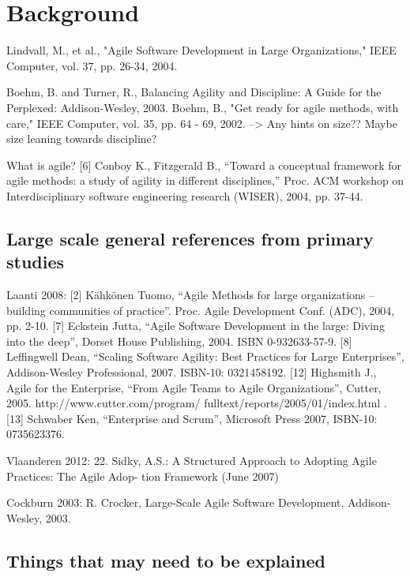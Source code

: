 \documentclass[preprint,authoryear,12pt]{elsarticle}
\begin{document}
\section{Background}
\label{sec:background}

Lindvall, M., et al., "Agile Software Development in Large Organizations,"
IEEE Computer, vol. 37, pp. 26-34, 2004.


Boehm, B. and Turner, R., Balancing Agility and Discipline: A Guide for the
Perplexed: Addison-Wesley, 2003.
Boehm, B., "Get ready for agile methods, with care," IEEE Computer, vol. 35,
pp. 64 - 69, 2002.
--> Any hints on size?? Maybe size leaning towards discipline?


What is agile?
[6] Conboy K., Fitzgerald B., “Toward a conceptual framework for agile methods:
a study of agility in different disciplines,”
Proc. ACM workshop on Interdisciplinary software engineering research (WISER), 2004, pp. 37-44.


\subsection{Large scale general references from primary studies}

Laanti 2008:
[2] Kähkönen Tuomo, “Agile Methods for large organizations – building communities of practice”.
Proc. Agile Development Conf. (ADC), 2004, pp. 2-10.
[7] Eckstein Jutta, “Agile Software Development in the large: Diving into the deep”,
Dorset House Publishing, 2004. ISBN 0-932633-57-9.
[8] Leffingwell Dean, “Scaling Software Agility: Best Practices for Large Enterprises”,
Addison-Wesley Professional, 2007. ISBN-10: 0321458192.
[12] Highsmith J., Agile for the Enterprise, “From Agile Teams to Agile Organizations”,
Cutter, 2005. http://www.cutter.com/program/ fulltext/reports/2005/01/index.html .
[13] Schwaber Ken, “Enterprise and Scrum”, Microsoft Press 2007, ISBN-10: 0735623376.

Vlaanderen 2012:
22. Sidky, A.S.: A Structured Approach to Adopting Agile Practices: The Agile Adop-
tion Framework (June 2007)

Cockburn 2003:
R. Crocker, Large-Scale Agile Software Development, Addison-Wesley, 2003.

\subsection{Things that may need to be explained}
\end{document}

